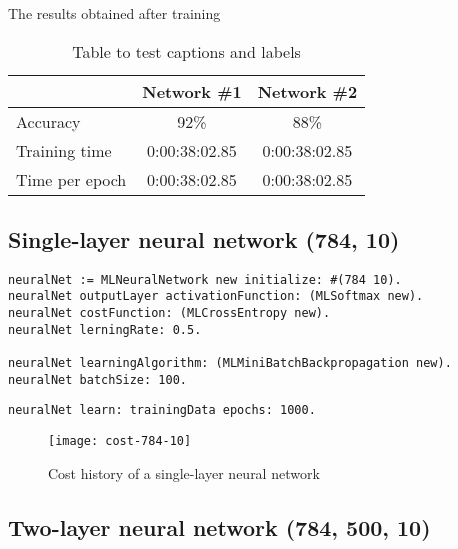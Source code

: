 The results obtained after training

\begin{table}[h!]
  \centering
  
  \begin{tabularx}{0.75\textwidth}{|H|CC|}
    \hline
                    & Network \#1       & Network \#2 \\
    \hline
    Accuracy        & 92\%              & 88\% \\
    Training time   & 0:00:38:02.85     & 0:00:38:02.85 \\
    Time per epoch  & 0:00:38:02.85     & 0:00:38:02.85 \\
    \hline
  \end{tabularx}
  
  \caption{Table to test captions and labels}
  \label{table:results}
\end{table}

\subsection{Single-layer neural network (784, 10)}

\begin{lstlisting}
neuralNet := MLNeuralNetwork new initialize: #(784 10).
neuralNet outputLayer activationFunction: (MLSoftmax new).
neuralNet costFunction: (MLCrossEntropy new).
neuralNet lerningRate: 0.5.

neuralNet learningAlgorithm: (MLMiniBatchBackpropagation new).
neuralNet batchSize: 100.
\end{lstlisting}

\begin{lstlisting}
neuralNet learn: trainingData epochs: 1000.
\end{lstlisting}

\begin{figure}[H]
  \centering
  \texttt{[image: cost-784-10]}
  \caption{Cost history of a single-layer neural network}
  \label{fig:cost-784-10}
\end{figure}

\subsection{Two-layer neural network (784, 500, 10)}
